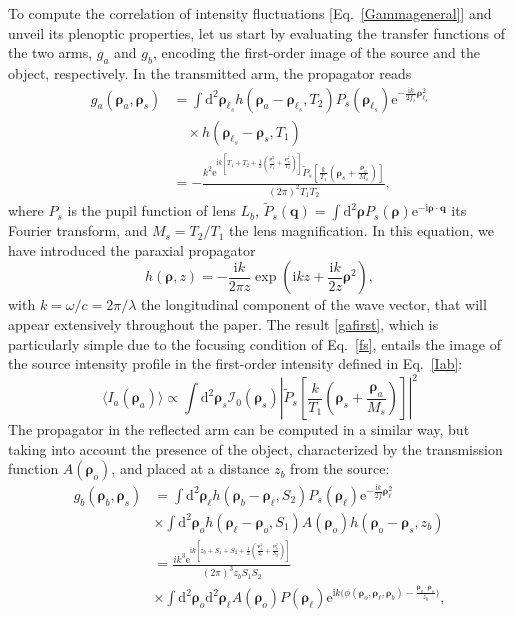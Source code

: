 \documentclass[aps,pra,amssymb,twocolumn,amsmath,superscriptaddress,showpacs,10pt]{revtex4-1}
\def\e{\mathrm{e}}
\def\d{\mathrm{d}}
\def\i{\mathrm{i}}
\def\I{\mathcal{I}}
\begin{document}
To compute the correlation of intensity fluctuations [Eq.~\eqref{Gammageneral}] and unveil its plenoptic properties, let us start by evaluating the transfer functions of the two arms, $g_a$ and $g_b$, encoding the first-order image of the source and the object, respectively. In the transmitted arm, the propagator reads
\begin{align}\label{gafirst}
g_a(\bm{\rho}_a,\bm{\rho}_s) & = \int \d^2\bm{\rho}_{\ell_s} h(\bm{\rho}_a-\bm{\rho}_{\ell_s},T_2) P_s( \bm{\rho}_{\ell_s} ) \e^{-\frac{\i k}{2f_s}\bm{\rho}_{\ell_s}^2} \nonumber \\
& \quad \times h(\bm{\rho}_{\ell_s}-\bm{\rho}_s,T_1) \nonumber \\
& = -\frac{k^2 \e^{\i k \!\left[T_1+T_2 +\frac{1}{2}\!\left(\frac{\bm{\rho}_s^2}{T_1}+ \frac{\bm{\rho}_a^2}{T_2}\right)\right]} \tilde{P}_s \!\left[\frac{k}{T_1}\!\left( \bm{\rho}_s + \frac{\bm{\rho}_a}{M_s} \right)\!\right]\! }{(2\pi)^2 T_1 T_2} ,
\end{align}
where $P_s$ is the pupil function of lens $L_b$, $\tilde{P}_s(\bm{q})=\int \d^2\bm{\rho} P_s(\bm{\rho}) \e^{-\i\bm{\rho}\cdot\bm{q}}$ its Fourier transform, and $M_s=T_2/T_1$ the lens magnification.
In this equation, we have introduced the paraxial propagator
\begin{equation}
h(\bm{\rho},z) = -\frac{\i k}{2\pi z} \exp\left( \i k z + \frac{\i k}{2z} \bm{\rho}^2 \right),
\end{equation}
with $k=\omega/c=2\pi/\lambda$ the longitudinal component of the wave vector, that will appear extensively throughout the paper. The result \eqref{gafirst}, which is particularly simple due to the focusing condition of Eq.~\eqref{fs}, entails the image of the source intensity profile in the first-order intensity defined in Eq.~\eqref{Iab}: 
\begin{equation}
\langle I_a(\bm{\rho}_a) \rangle \propto \int \d^2\bm{\rho}_s \I_0(\bm{\rho}_s) \!\left| \tilde{P}_s \!\left[\frac{k}{T_1}\!\left( \bm{\rho}_s + \frac{\bm{\rho}_a}{M_s} \right)\!\right]\!  \right|^2
\end{equation}
The propagator in the reflected arm can be computed in a similar way, but taking into account the presence of the object, characterized by the transmission function $A(\bm{\rho}_o)$, and placed at a distance $z_b$ from the source:
\begin{align}
g_b(\bm{\rho}_b,\bm{\rho}_s) & = \int \d^2\bm{\rho}_{\ell} h(\bm{\rho}_b-\bm{\rho}_{\ell},S_2) P_s( \bm{\rho}_{\ell} ) \e^{-\frac{\i k}{2f}\bm{\rho}_{\ell}^2} \nonumber \\
& \times\!\int\!\d^2\bm{\rho}_o h(\bm{\rho}_{\ell}-\bm{\rho}_o,S_1) A(\bm{\rho}_o) h(\bm{\rho}_o-\bm{\rho}_s,z_b) \nonumber \\
& = \frac{i k^3 \e^{\i k\!\left[ z_b+S_1+S_2 + \frac{1}{2}\!\left(\frac{\bm{\rho}_s^2}{z_b}+ \frac{\bm{\rho}_b^2}{S_2}\right)\!\right]} }{(2\pi)^3 z_b S_1 S_2} \nonumber \\
& \times \!\int\!\d^2\bm{\rho}_o\d^2\bm{\rho}_{\ell} A(\bm{\rho}_o) P (\bm{\rho}_{\ell}) \e^{\i k \bigl( \phi(\bm{\rho}_o,\bm{\rho}_{\ell},\bm{\rho}_b) - \frac{\bm{\rho}_o\cdot\bm{\rho}_s}{z_b}\bigr)} ,
\end{align}
\end{document}
